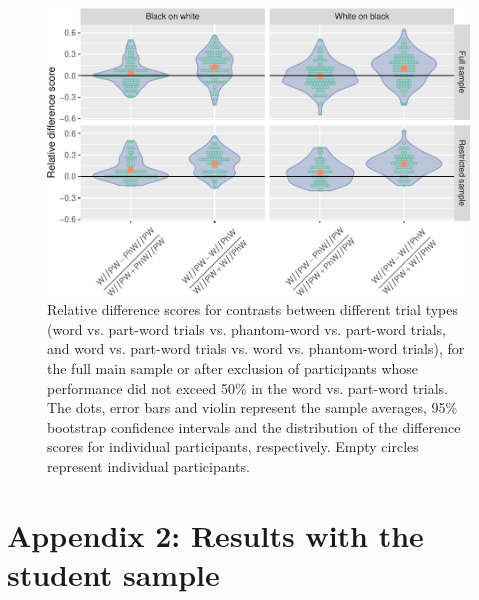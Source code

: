 \documentclass[
]{article}
\begin{document}
\begin{figure}

{\centering \includegraphics[width=0.8\linewidth]{vsl_phamtoms_simultaneous_results_files/figure-latex/vsl-simultaneous-fa-plot-difference-scores-plot-testable-1} 

}

\caption{Relative difference scores for contrasts between different trial types (word vs. part-word trials vs. phantom-word vs. part-word trials, and word vs. part-word trials vs. word vs. phantom-word trials), for the full main sample or after exclusion of participants whose performance did not exceed 50\% in the word vs. part-word trials. The dots, error bars and violin represent the sample averages, 95\% bootstrap confidence intervals and the distribution of the difference scores for individual participants, respectively. Empty circles represent individual participants.}\label{fig:vsl-simultaneous-fa-plot-difference-scores-plot-testable}
\end{figure}

\clearpage

\section{Appendix 2: Results with the student
sample}\label{appendix-2-results-with-the-student-sample}
\end{document}
